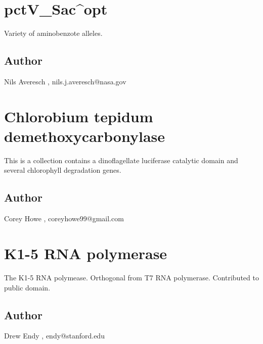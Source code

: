 \documentclass{article}%
\begin{document}
%
\section{pctV\_Sac\^{}opt}%
Variety of aminobenzote alleles. %
\subsection{Author}%
Nils Averesch%
,%
nils.j.averesch@nasa.gov

%
\section{Chlorobium tepidum demethoxycarbonylase}%
This is a collection contains a dinoflagellate  luciferase catalytic domain and several chlorophyll degradation genes.%
\subsection{Author}%
Corey Howe%
,%
coreyhowe99@gmail.com

%
\section{K1{-}5 RNA polymerase}%
The K1{-}5 RNA polymease. Orthogonal from T7 RNA polymerase. Contributed to public domain. %
\subsection{Author}%
Drew Endy%
,%
endy@stanford.edu

%
\end{document}
